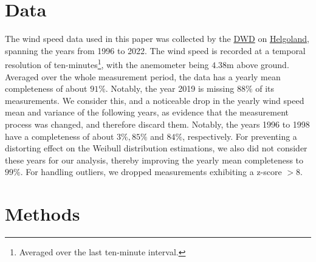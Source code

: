 \documentclass{article}
\theoremstyle{plain}
\theoremstyle{definition}
\theoremstyle{remark}
\begin{document}
\fi


\section{Data}\label{sec:data}

The wind speed data used in this paper was collected by the \href{https://www.dwd.de}{DWD} on \href{https://www.openstreetmap.org/?mlat=54.1750&mlon=7.8920#map=15/54.1750/7.8920}{Helgoland}, spanning the years from 1996 to 2022. The wind speed is recorded at a temporal resolution of ten-minutes\footnote{Averaged over the last ten-minute interval.}, with the anemometer being $4.38 \mathrm{m}$ above ground. Averaged over the whole measurement period, the data has a yearly mean completeness of about $91\%$. Notably, the year 2019 is missing $88\%$ of its measurements. We consider this, and a noticeable drop in the yearly wind speed mean and variance of the following years, as evidence that the measurement process was changed, and therefore discard them. Notably, the years 1996 to 1998 have a completeness of about $3\%, 85\%$ and $84\%$, respectively. For preventing a distorting effect on the Weibull distribution estimations, we also did not consider these years for our analysis, thereby improving the yearly mean completeness to $99\%$. For handling outliers, we dropped measurements exhibiting a z-score $> 8$.

\section{Methods}\label{sec:methods}
\end{document}
